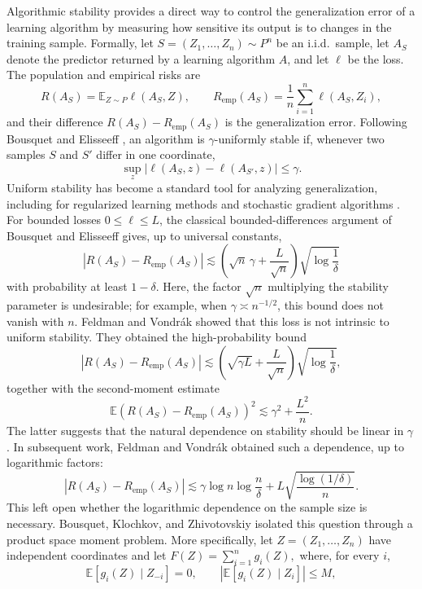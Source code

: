 \documentclass[11pt]{article}
\newcommand{\E}{\mathbb{E}}
\newcommand{\abs}[1]{\left\lvert #1\right\rvert}
\begin{document}
Algorithmic stability provides a direct way to control the generalization error of a learning algorithm by measuring how sensitive its output is to changes in the training sample. Formally, let \(S=(Z_1,\ldots,Z_n)\sim P^n\) be an i.i.d.\ sample, let \(A_S\) denote the predictor returned by a learning algorithm \(A\), and let \(\ell\) be the loss. The population and empirical risks are
\[
R(A_S)=\E_{Z\sim P}\ell(A_S,Z), \qquad R_{\mathrm{emp}}(A_S)=\frac1n\sum_{i=1}^n\ell(A_S,Z_i),
\]
and their difference \(R(A_S)-R_{\mathrm{emp}}(A_S)\) is the generalization error. Following Bousquet and Elisseeff \cite{bousquet2002stability}, an algorithm is \(\gamma\)-uniformly stable if, whenever two samples \(S\) and \(S'\) differ in one coordinate,
\[
\sup_z\abs{\ell(A_S,z)-\ell(A_{S'},z)}\le\gamma.
\]
Uniform stability has become a standard tool for analyzing generalization, including for regularized learning methods \cite{bousquet2002stability} and stochastic gradient algorithms \cite{hardt2016train}. For bounded losses \(0\le\ell\le L\), the classical bounded-differences argument of Bousquet and Elisseeff gives, up to universal constants,
\[
\abs{R(A_S)-R_{\mathrm{emp}}(A_S)}
\lesssim
\left(\sqrt n\,\gamma+\frac{L}{\sqrt n}\right)\sqrt{\log\frac1\delta}
\]
with probability at least \(1-\delta\). Here, the factor \(\sqrt n\) multiplying the stability parameter is undesirable; for example, when \(\gamma\asymp n^{-1/2}\), this bound does not vanish with \(n\). Feldman and Vondr\'ak \cite{feldman2018generalization} showed that this loss is not intrinsic to uniform stability. They obtained the high-probability bound
\[
\abs{R(A_S)-R_{\mathrm{emp}}(A_S)}
\lesssim
\left(\sqrt{\gamma L}+\frac{L}{\sqrt n}\right)\sqrt{\log\frac1\delta},
\]
together with the second-moment estimate
\[
\E\left(R(A_S)-R_{\mathrm{emp}}(A_S)\right)^2\lesssim\gamma^2+\frac{L^2}{n}.
\]
The latter suggests that the natural dependence on stability should be linear in \(\gamma\). In subsequent work, Feldman and Vondr\'ak \cite{feldman2019highprob} obtained such a dependence, up to logarithmic factors:
\[
\abs{R(A_S)-R_{\mathrm{emp}}(A_S)}
\lesssim
\gamma\log n\log\frac{n}{\delta}
+
L\sqrt{\frac{\log(1/\delta)}{n}}.
\]
This left open whether the logarithmic dependence on the sample size is necessary. Bousquet, Klochkov, and Zhivotovskiy \cite{bkz2020} isolated this question through a product space moment problem. More specifically, let \(Z=(Z_1,\ldots,Z_n)\) have independent coordinates and let
\(
F(Z)=\sum_{i=1}^n g_i(Z),
\)
where, for every \(i\),
\[
\E[g_i(Z)\mid Z_{-i}]=0, \qquad \abs{\E[g_i(Z)\mid Z_i]}\le M,
\]
\end{document}
